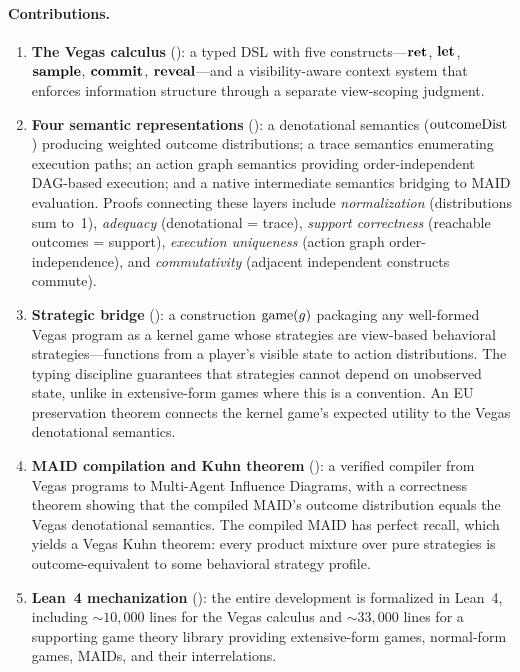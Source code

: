 \documentclass[11pt]{article}
\begin{document}
\paragraph{Contributions.}
\begin{enumerate}[nosep]
\item \textbf{The Vegas calculus} (): a typed
      DSL with five constructs---$\mathbf{ret}$, $\mathbf{let}$, $\mathbf{sample}$, $\mathbf{commit}$,
      $\mathbf{reveal}$---and a visibility-aware context system that enforces
      information structure through a separate view-scoping judgment.

\item \textbf{Four semantic representations} ():
      a denotational semantics ($\mathrm{outcomeDist}$) producing weighted outcome
      distributions; a trace semantics enumerating execution paths;
      an action graph semantics providing order-independent DAG-based
      execution; and a native intermediate semantics bridging to MAID
      evaluation.
      Proofs connecting these layers include
      \emph{normalization} (distributions sum to~1),
      \emph{adequacy} (denotational = trace),
      \emph{support correctness} (reachable outcomes = support),
      \emph{execution uniqueness} (action graph order-independence),
      and \emph{commutativity} (adjacent independent constructs commute).

\item \textbf{Strategic bridge} (): a construction
      $\mathrm{game}(g)$ packaging any well-formed Vegas program as a kernel game whose
      strategies are view-based behavioral strategies---functions from a
      player's visible state to action distributions. The typing discipline
      guarantees that strategies cannot depend on unobserved state, unlike
      in extensive-form games where this is a convention. An EU preservation
      theorem connects the kernel game's expected utility to the Vegas
      denotational semantics.

\item \textbf{MAID compilation and Kuhn theorem} (): a
      verified compiler from Vegas programs to Multi-Agent Influence Diagrams,
      with a correctness theorem showing that the compiled MAID's outcome
      distribution equals the Vegas denotational semantics. The compiled MAID
      has perfect recall, which yields a Vegas Kuhn theorem: every product
      mixture over pure strategies is outcome-equivalent to some behavioral
      strategy profile.

\item \textbf{Lean~4 mechanization} (): the entire
      development is formalized in Lean~4, including ${\sim}10{,}000$ lines for
      the Vegas calculus and ${\sim}33{,}000$ lines for a supporting game
      theory library providing extensive-form games, normal-form games, MAIDs,
      and their interrelations.
\end{enumerate}
\end{document}
